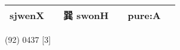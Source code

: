 \documentclass[14pt,a4paper]{scrartcl}
\begin{document}
\begin{longtable}[c]{@{}llllll@{}}
\begin{minipage}[t]{0.14\columnwidth}
sjwenX
\strut\end{minipage} &
\begin{minipage}[t]{0.14\columnwidth}\raggedright\strut
\strut\end{minipage} &
\begin{minipage}[t]{0.14\columnwidth}\raggedright\strut
巽 swonH
\strut\end{minipage} &
\begin{minipage}[t]{0.14\columnwidth}\raggedright\strut
\strut\end{minipage} &
\begin{minipage}[t]{0.14\columnwidth}\raggedright\strut
pure:A
\strut\end{minipage}\tabularnewline
\bottomrule
\end{longtable}

(92) 0437 {[}3{]}
\end{document}
